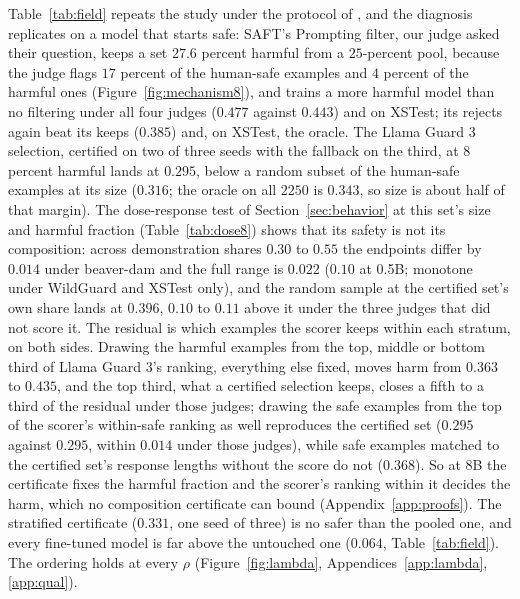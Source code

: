 \documentclass{article} %
\begin{document}
Table~\ref{tab:field} repeats the study under the protocol of \citet{choi2024saft}, and the diagnosis replicates on a model that starts safe: SAFT's Prompting filter, our judge asked their question, keeps a set $27.6$ percent harmful from a $25$-percent pool, because the judge flags $17$ percent of the human-safe examples and $4$ percent of the harmful ones (Figure~\ref{fig:mechanism8}), and trains a more harmful model than no filtering under all four judges ($0.477$ against $0.443$) and on XSTest; its rejects again beat its keeps ($0.385$) and, on XSTest, the oracle. The Llama Guard 3 selection, certified on two of three seeds with the fallback on the third, at $8$ percent harmful lands at $0.295$, below a random subset of the human-safe examples at its size ($0.316$; the oracle on all $2250$ is $0.343$, so size is about half of that margin). The dose-response test of Section~\ref{sec:behavior} at this set's size and harmful fraction (Table~\ref{tab:dose8}) shows that its safety is not its composition: across demonstration shares $0.30$ to $0.55$ the endpoints differ by $0.014$ under beaver-dam and the full range is $0.022$ ($0.10$ at 0.5B; monotone under WildGuard and XSTest only), and the random sample at the certified set's own share lands at $0.396$, $0.10$ to $0.11$ above it under the three judges that did not score it. The residual is which examples the scorer keeps within each stratum, on both sides. Drawing the harmful examples from the top, middle or bottom third of Llama Guard 3's ranking, everything else fixed, moves harm from $0.363$ to $0.435$, and the top third, what a certified selection keeps, closes a fifth to a third of the residual under those judges; drawing the safe examples from the top of the scorer's within-safe ranking as well reproduces the certified set ($0.295$ against $0.295$, within $0.014$ under those judges), while safe examples matched to the certified set's response lengths without the score do not ($0.368$). So at 8B the certificate fixes the harmful fraction and the scorer's ranking within it decides the harm, which no composition certificate can bound (Appendix~\ref{app:proofs}). The stratified certificate ($0.331$, one seed of three) is no safer than the pooled one, and every fine-tuned model is far above the untouched one ($0.064$, Table~\ref{tab:field}). The ordering holds at every $\rho$ (Figure~\ref{fig:lambda}, Appendices~\ref{app:lambda}, \ref{app:qual}).
\end{document}
